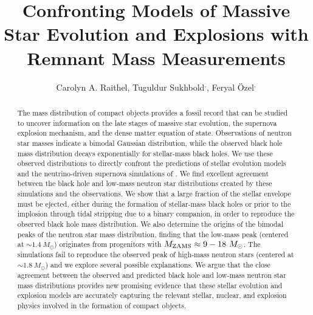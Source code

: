 \documentclass[]{emulateapj}
\newcommand{\Ms}{M_{\odot}}
\newcommand{\Mz}{M_{\rm ZAMS}}
\begin{document}
\title{Confronting Models of Massive Star Evolution and Explosions with Remnant Mass Measurements}
\author{Carolyn A. Raithel, Tuguldur Sukhbold$^{,}$, Feryal \"Ozel$^{,}$}



\begin{abstract}
The mass distribution of compact objects provides a fossil record that can be studied to uncover information on the late stages of massive star evolution, the supernova explosion mechanism, and the dense matter equation of state. Observations of neutron star masses indicate a bimodal Gaussian distribution, while the observed black hole mass distribution decays exponentially for stellar-mass black holes. We use these observed distributions to directly confront the predictions of stellar evolution models and the neutrino-driven supernova simulations of \citet{Sukhbold2016}. We find excellent agreement between the black hole and low-mass neutron star distributions created by these simulations and the observations. We show that a large fraction of the stellar envelope must be ejected, either during the formation of stellar-mass black holes or prior to the implosion through tidal stripping due to a binary companion, in order to reproduce the observed black hole mass distribution. We also determine the origins of the bimodal peaks of the neutron star mass distribution, finding that the low-mass peak (centered at $\sim1.4~\Ms$) originates from progenitors with $\Mz\approx9-18~\Ms$. The simulations fail to reproduce the observed peak of high-mass neutron stars (centered at $\sim1.8~\Ms$) and we explore several possible explanations. We argue that the close agreement between the observed and predicted black hole and low-mass neutron star mass distributions provides new promising evidence that these stellar evolution and explosion models are accurately capturing the relevant stellar, nuclear, and explosion physics involved in the formation of compact objects.
\end{abstract}
\end{document}
